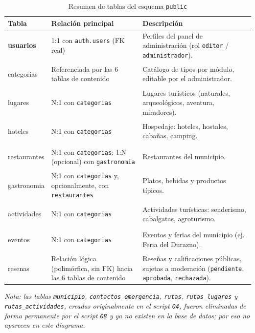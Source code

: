 \begin{table}[H]
\centering
\caption{Resumen de tablas del esquema \texttt{public}}
\label{tab:entidad-relacion}
\renewcommand{\arraystretch}{1.3}
\begin{tabular}{|>{\bfseries}p{2.7cm}|p{5.0cm}|p{5.8cm}|}
\hline
Tabla & Relación principal & Descripción \\ \hline

usuarios & 1:1 con \texttt{auth.users} (FK real) &
Perfiles del panel de administración (rol \texttt{editor} /
\texttt{administrador}). \\ \hline

categorias & Referenciada por las 6 tablas de contenido &
Catálogo de tipos por módulo, editable por el administrador. \\ \hline

lugares & N:1 con \texttt{categorias} &
Lugares turísticos (naturales, arqueológicos, aventura, miradores). \\ \hline

hoteles & N:1 con \texttt{categorias} &
Hospedaje: hoteles, hostales, cabañas, camping. \\ \hline

restaurantes & N:1 con \texttt{categorias}; 1:N (opcional) con \texttt{gastronomia} &
Restaurantes del municipio. \\ \hline

gastronomia & N:1 con \texttt{categorias} y, opcionalmente, con \texttt{restaurantes} &
Platos, bebidas y productos típicos. \\ \hline

actividades & N:1 con \texttt{categorias} &
Actividades turísticas: senderismo, cabalgatas, agroturismo. \\ \hline

eventos & N:1 con \texttt{categorias} &
Eventos y ferias del municipio (ej. Feria del Durazno). \\ \hline

resenas & Relación lógica (polimórfica, sin FK) hacia las 6 tablas de contenido &
Reseñas y calificaciones públicas, sujetas a moderación
(\texttt{pendiente}, \texttt{aprobada}, \texttt{rechazada}). \\ \hline

\end{tabular}
\end{table}

\textit{Nota: las tablas \texttt{municipio}, \texttt{contactos\_emergencia},
\texttt{rutas}, \texttt{rutas\_lugares} y \texttt{rutas\_actividades},
creadas originalmente en el script \texttt{04}, fueron eliminadas de
forma permanente por el script \texttt{08} y ya no existen en la base de
datos; por eso no aparecen en este diagrama.}
